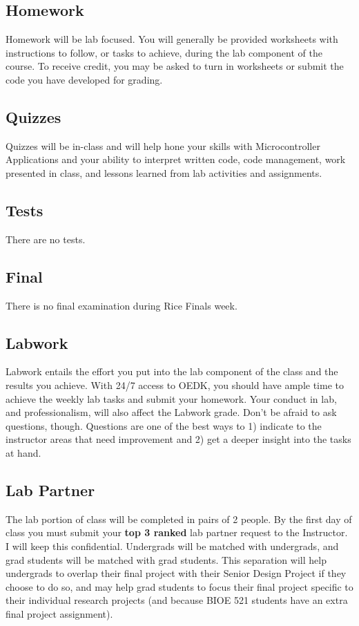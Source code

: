 \documentclass[10pt]{article}
\begin{document}
\subsection*{Homework}
Homework will be lab focused. You will generally be provided worksheets with instructions to follow, or tasks to achieve, during the lab component of the course. To receive credit, you may be asked to turn in worksheets or submit the code you have developed for grading.

\subsection*{Quizzes}
Quizzes will be in-class and will help hone your skills with Microcontroller Applications and your ability to interpret written code, code management, work presented in class, and lessons learned from lab activities and assignments.

\subsection*{Tests}
There are no tests.

\subsection*{Final}
There is no final examination during Rice Finals week.


\subsection*{Labwork}
Labwork entails the effort you put into the lab component of the class and the results you achieve. With 24/7 access to OEDK, you should have ample time to achieve the weekly lab tasks and submit your homework. Your conduct in lab, and professionalism, will also affect the Labwork grade. Don't be afraid to ask questions, though. Questions are one of the best ways to 1) indicate to the instructor areas that need improvement and 2) get a deeper insight into the tasks at hand.

\subsection*{Lab Partner}
The lab portion of class will be completed in pairs of 2 people. By the first day of class you must submit your \textbf{top 3 ranked} lab partner request to the Instructor. I will keep this confidential. Undergrads will be matched with undergrads, and grad students will be matched with grad students. This separation will help undergrads to overlap their final project with their Senior Design Project if they choose to do so, and may help grad students to focus their final project specific to their individual research projects (and because BIOE 521 students have an extra final project assignment).
\end{document}
